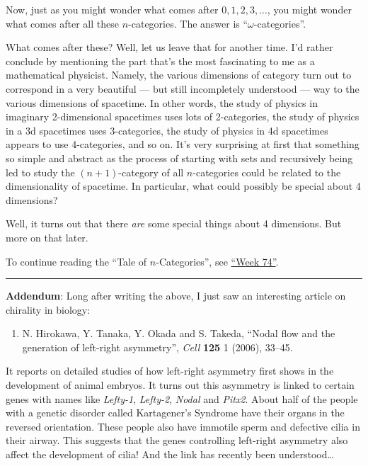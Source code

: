 \documentclass{article}
\def\tightlist{}
\begin{document}
Now, just as you might wonder what comes after \(0,1,2,3,\ldots\), you
might wonder what comes after all these \(n\)-categories. The answer is
``\(\omega\)-categories''.

What comes after these? Well, let us leave that for another time. I'd
rather conclude by mentioning the part that's the most fascinating to me
as a mathematical physicist. Namely, the various dimensions of category
turn out to correspond in a very beautiful --- but still incompletely
understood --- way to the various dimensions of spacetime. In other
words, the study of physics in imaginary 2-dimensional spacetimes uses
lots of 2-categories, the study of physics in a 3d spacetimes uses
3-categories, the study of physics in 4d spacetimes appears to use
4-categories, and so on. It's very surprising at first that something so
simple and abstract as the process of starting with sets and recursively
being led to study the \((n+1)\)-category of all \(n\)-categories could
be related to the dimensionality of spacetime. In particular, what could
possibly be special about 4 dimensions?

Well, it turns out that there \emph{are} some special things about 4
dimensions. But more on that later.

To continue reading the ``Tale of \(n\)-Categories'', see
\protect\hyperlink{week74}{``Week 74''}.

\begin{center}\rule{0.5\linewidth}{0.5pt}\end{center}

\textbf{Addendum}: Long after writing the above, I just saw an
interesting article on chirality in biology:

\begin{enumerate}
\def\labelenumi{\arabic{enumi})}
\setcounter{enumi}{1}
\tightlist
\item
  N. Hirokawa, Y. Tanaka, Y. Okada and S. Takeda, ``Nodal flow and the
  generation of left-right asymmetry'', \emph{Cell} \textbf{125} 1
  (2006), 33--45.
\end{enumerate}

It reports on detailed studies of how left-right asymmetry first shows
in the development of animal embryos. It turns out this asymmetry is
linked to certain genes with names like \emph{Lefty-1}, \emph{Lefty-2},
\emph{Nodal} and \emph{Pitx2}. About half of the people with a genetic
disorder called Kartagener's Syndrome have their organs in the reversed
orientation. These people also have immotile sperm and defective cilia
in their airway. This suggests that the genes controlling left-right
asymmetry also affect the development of cilia! And the link has
recently been understood\ldots{}
\end{document}
